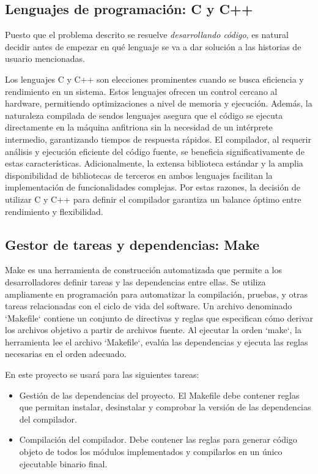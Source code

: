 \subsection{Lenguajes de programación: C y C++}
Puesto que el problema descrito se resuelve \textit{desarrollando código}, es natural decidir antes de empezar en qué lenguaje se va a dar solución a las historias de usuario mencionadas.


Los lenguajes C y C++ son elecciones prominentes cuando se busca eficiencia y rendimiento en un sistema. Estos lenguajes ofrecen un control cercano al hardware, permitiendo optimizaciones a nivel de memoria y ejecución. Además, la naturaleza compilada de sendos lenguajes asegura que el código se ejecuta directamente en la máquina anfitriona sin la necesidad de un intérprete intermedio, garantizando tiempos de respuesta rápidos. El compilador, al requerir análisis y ejecución eficiente del código fuente, se beneficia significativamente de estas características. Adicionalmente, la extensa biblioteca estándar y la amplia disponibilidad de bibliotecas de terceros en ambos lenguajes facilitan la implementación de funcionalidades complejas. Por estas razones, la decisión de utilizar C y C++ para definir el compilador garantiza un balance óptimo entre rendimiento y flexibilidad.

\subsection{Gestor de tareas y dependencias: Make}
Make es una herramienta de construcción automatizada que permite a los desarrolladores definir tareas y las dependencias entre ellas. Se utiliza ampliamente en programación para automatizar la compilación, pruebas, y otras tareas relacionadas con el ciclo de vida del software. Un archivo denominado `Makefile` contiene un conjunto de directivas y reglas que especifican cómo derivar los archivos objetivo a partir de archivos fuente. Al ejecutar la orden `make`, la herramienta lee el archivo `Makefile`, evalúa las dependencias y ejecuta las reglas necesarias en el orden adecuado.


\noindent
En este proyecto se usará para las siguientes tareas:
\begin{itemize}
    \item Gestión de las dependencias del proyecto. El Makefile debe contener reglas que permitan instalar, desinstalar y comprobar la versión de las dependencias del compilador.
    \item Compilación del compilador. Debe contener las reglas para generar código objeto de todos los módulos implementados y compilarlos en un único ejecutable binario final.
\end{itemize}

